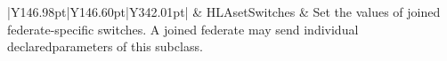 \begin{landscape}
\begin{momtabletypeset}[8.00]
{{\begin{tabular}{|Y{146.98pt}|Y{146.60pt}|Y{342.01pt}|}
                    & HLAsetSwitches          & Set the values of joined federate-specific switches.\allowbreak{} A joined federate may send individual declared\allowbreak{}parameters of this subclass.\allowbreak{}                                                                                                                                                                                                                                                                                                                                                                                                                                                                                                                                                                                                                                                                                                                                                                                                                                                                                                                                                                                                                                                                                                                                                                                                                                                                                                                                                                                               \\
                    \hline
                \end{tabular}%
            }%
        }%
    \end{momtabletypeset}
    \newpage


\end{landscape}
